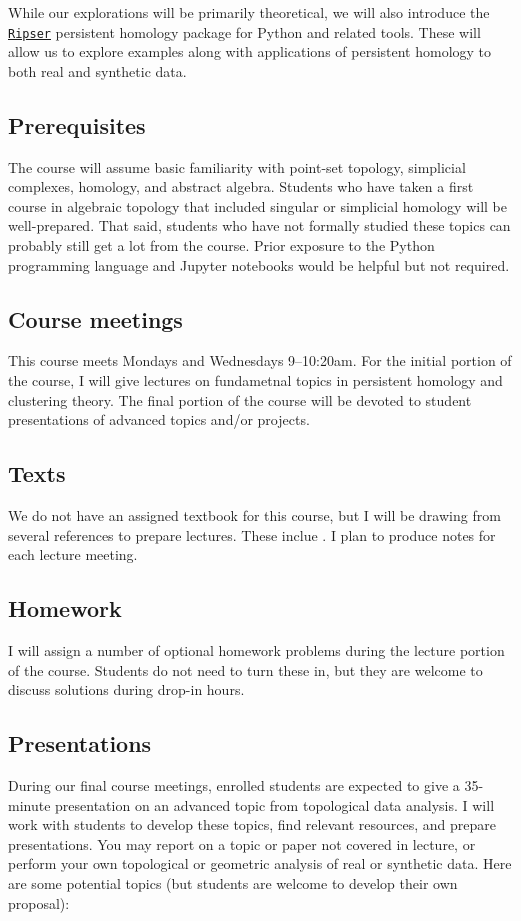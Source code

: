 \documentclass[11pt,twoside]{amsart}
\begin{document}
While our explorations will be primarily theoretical, we will also introduce the \href{https://ripser.scikit-tda.org/}{\texttt{Ripser}} persistent homology package for Python and related tools. These will allow us to explore examples along with applications of persistent homology to both real and synthetic data.

\subsection*{Prerequisites}
The course will assume basic familiarity with point-set topology, simplicial complexes, homology, and abstract algebra. Students who have taken a first course in algebraic topology that included singular or simplicial homology will be well-prepared. That said, students who have not formally studied these topics can probably still get a lot from the course. Prior exposure to the Python programming language and Jupyter notebooks would be helpful but not required.

\subsection*{Course meetings}
This course meets Mondays and Wednesdays 9--10:20am. For the initial portion of the course, I will give lectures on fundametnal topics in persistent homology and clustering theory. The final portion of the course will be devoted to student presentations of advanced topics and/or projects.

\subsection*{Texts}
We do not have an assigned textbook for this course, but I will be drawing from several references to prepare lectures. These inclue \cite{tda_apps,dey_wang,lesnick,oudot,rabadan_blumberg,virk}. I plan to produce notes for each lecture meeting.

\subsection*{Homework}
I will assign a number of optional homework problems during the lecture portion of the course. Students do not need to turn these in, but they are welcome to discuss solutions during drop-in hours.

\subsection*{Presentations}
During our final course meetings, enrolled students are expected to give a 35-minute presentation on an advanced topic from topological data analysis. I will work with students to develop these topics, find relevant resources, and prepare presentations. You may report on a topic or paper not covered in lecture, or perform your own topological or geometric analysis of real or synthetic data. Here are some potential topics (but students are welcome to develop their own proposal):
\end{document}

